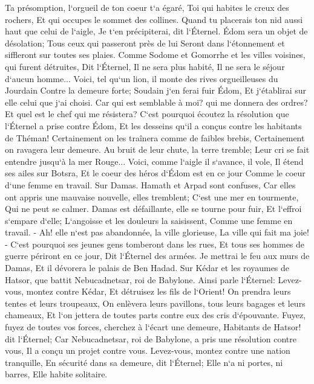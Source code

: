 \verse Ta présomption, l`orgueil de ton coeur t`a égaré, Toi qui habites le creux des rochers, Et qui occupes le sommet des collines. Quand tu placerais ton nid aussi haut que celui de l`aigle, Je t`en précipiterai, dit l`Éternel. 
\verse Édom sera un objet de désolation; Tous ceux qui passeront près de lui Seront dans l`étonnement et siffleront sur toutes ses plaies. 
\verse Comme Sodome et Gomorrhe et les villes voisines, qui furent détruites, Dit l`Éternel, Il ne sera plus habité, Il ne sera le séjour d`aucun homme... 
\verse Voici, tel qu`un lion, il monte des rives orgueilleuses du Jourdain Contre la demeure forte; Soudain j`en ferai fuir Édom, Et j`établirai sur elle celui que j`ai choisi. Car qui est semblable à moi? qui me donnera des ordres? Et quel est le chef qui me résistera? 
\verse C`est pourquoi écoutez la résolution que l`Éternel a prise contre Édom, Et les desseins qu`il a conçus contre les habitants de Théman! Certainement on les traînera comme de faibles brebis, Certainement on ravagera leur demeure. 
\verse Au bruit de leur chute, la terre tremble; Leur cri se fait entendre jusqu`à la mer Rouge... 
\verse Voici, comme l`aigle il s`avance, il vole, Il étend ses ailes sur Botsra, Et le coeur des héros d`Édom est en ce jour Comme le coeur d`une femme en travail. 
\verse Sur Damas. Hamath et Arpad sont confuses, Car elles ont appris une mauvaise nouvelle, elles tremblent; C`est une mer en tourmente, Qui ne peut se calmer. 
\verse Damas est défaillante, elle se tourne pour fuir, Et l`effroi s`empare d`elle; L`angoisse et les douleurs la saisissent, Comme une femme en travail. - 
\verse Ah! elle n`est pas abandonnée, la ville glorieuse, La ville qui fait ma joie! - 
\verse C`est pourquoi ses jeunes gens tomberont dans les rues, Et tous ses hommes de guerre périront en ce jour, Dit l`Éternel des armées. 
\verse Je mettrai le feu aux murs de Damas, Et il dévorera le palais de Ben Hadad. 
\verse Sur Kédar et les royaumes de Hatsor, que battit Nebucadnetsar, roi de Babylone. Ainsi parle l`Éternel: Levez-vous, montez contre Kédar, Et détruisez les fils de l`Orient! 
\verse On prendra leurs tentes et leurs troupeaux, On enlèvera leurs pavillons, tous leurs bagages et leurs chameaux, Et l`on jettera de toutes parts contre eux des cris d`épouvante. 
\verse Fuyez, fuyez de toutes vos forces, cherchez à l`écart une demeure, Habitants de Hatsor! dit l`Éternel; Car Nebucadnetsar, roi de Babylone, a pris une résolution contre vous, Il a conçu un projet contre vous. 
\verse Levez-vous, montez contre une nation tranquille, En sécurité dans sa demeure, dit l`Éternel; Elle n`a ni portes, ni barres, Elle habite solitaire. 
